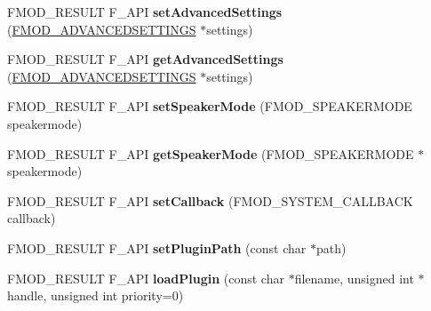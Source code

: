 \begin{DoxyCompactItemize}
\item 
F\+M\+O\+D\+\_\+\+R\+E\+S\+U\+LT F\+\_\+\+A\+PI {\bfseries set\+Advanced\+Settings} (\hyperlink{struct_f_m_o_d___a_d_v_a_n_c_e_d_s_e_t_t_i_n_g_s}{F\+M\+O\+D\+\_\+\+A\+D\+V\+A\+N\+C\+E\+D\+S\+E\+T\+T\+I\+N\+GS} $\ast$settings)\hypertarget{class_f_m_o_d_1_1_system_a8e7c0f550c5c540d8889fb835992cff5}{}\label{class_f_m_o_d_1_1_system_a8e7c0f550c5c540d8889fb835992cff5}

\item 
F\+M\+O\+D\+\_\+\+R\+E\+S\+U\+LT F\+\_\+\+A\+PI {\bfseries get\+Advanced\+Settings} (\hyperlink{struct_f_m_o_d___a_d_v_a_n_c_e_d_s_e_t_t_i_n_g_s}{F\+M\+O\+D\+\_\+\+A\+D\+V\+A\+N\+C\+E\+D\+S\+E\+T\+T\+I\+N\+GS} $\ast$settings)\hypertarget{class_f_m_o_d_1_1_system_a9c111315da6297cb6889aedfd46c3daa}{}\label{class_f_m_o_d_1_1_system_a9c111315da6297cb6889aedfd46c3daa}

\item 
F\+M\+O\+D\+\_\+\+R\+E\+S\+U\+LT F\+\_\+\+A\+PI {\bfseries set\+Speaker\+Mode} (F\+M\+O\+D\+\_\+\+S\+P\+E\+A\+K\+E\+R\+M\+O\+DE speakermode)\hypertarget{class_f_m_o_d_1_1_system_a08636005f5f2a6a435470a56a3bfb6a8}{}\label{class_f_m_o_d_1_1_system_a08636005f5f2a6a435470a56a3bfb6a8}

\item 
F\+M\+O\+D\+\_\+\+R\+E\+S\+U\+LT F\+\_\+\+A\+PI {\bfseries get\+Speaker\+Mode} (F\+M\+O\+D\+\_\+\+S\+P\+E\+A\+K\+E\+R\+M\+O\+DE $\ast$speakermode)\hypertarget{class_f_m_o_d_1_1_system_a4ed6cc41bbb35016a0093054c17c0a4a}{}\label{class_f_m_o_d_1_1_system_a4ed6cc41bbb35016a0093054c17c0a4a}

\item 
F\+M\+O\+D\+\_\+\+R\+E\+S\+U\+LT F\+\_\+\+A\+PI {\bfseries set\+Callback} (F\+M\+O\+D\+\_\+\+S\+Y\+S\+T\+E\+M\+\_\+\+C\+A\+L\+L\+B\+A\+CK callback)\hypertarget{class_f_m_o_d_1_1_system_a479bb915a2e04c9374f599f007b6cc0a}{}\label{class_f_m_o_d_1_1_system_a479bb915a2e04c9374f599f007b6cc0a}

\item 
F\+M\+O\+D\+\_\+\+R\+E\+S\+U\+LT F\+\_\+\+A\+PI {\bfseries set\+Plugin\+Path} (const char $\ast$path)\hypertarget{class_f_m_o_d_1_1_system_ae1a00669920caf97abb5228d2053a28a}{}\label{class_f_m_o_d_1_1_system_ae1a00669920caf97abb5228d2053a28a}

\item 
F\+M\+O\+D\+\_\+\+R\+E\+S\+U\+LT F\+\_\+\+A\+PI {\bfseries load\+Plugin} (const char $\ast$filename, unsigned int $\ast$handle, unsigned int priority=0)\hypertarget{class_f_m_o_d_1_1_system_a046e94ca835e30f60564dbf44cfa111f}{}\label{class_f_m_o_d_1_1_system_a046e94ca835e30f60564dbf44cfa111f}


\end{DoxyCompactItemize}
